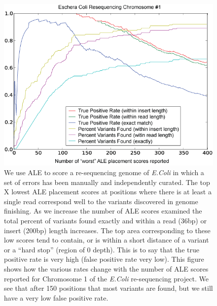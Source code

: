 \documentclass[phd,tocprelim]{cornell}
\begin{document}
\begin{figure}[hpt]
 	\centerline{\includegraphics[width=\textwidth]{figures/ALE/fig6_top.png}}
    \caption[ROC curve vs. number of reported errors]{We use ALE to score a re-sequencing genome of {\it E.Coli} in which a set of errors has
been manually and independently curated. The top X lowest ALE placement scores at positions
where there is at least a single read correspond well to the variants discovered in genome
finishing. As we increase the number of ALE scores examined the total percent of variants found
exactly and within a read (36bp) or insert (200bp) length increases. The top area corresponding to
these low scores tend to contain, or is within a short distance of a variant or a “hard stop” (region
of 0 depth). This is to say that the true positive rate is very high (false positive rate very low). This figure
shows how the various rates change with the number of ALE scores reported for Chromosome 1
of the {\it E.Coli} re-sequencing project. We see that after 150 positions that most variants are found,
but we still have a very low false positive rate.}
 	\label{fig:ROC_ALE}
\end{figure}
\end{document}
